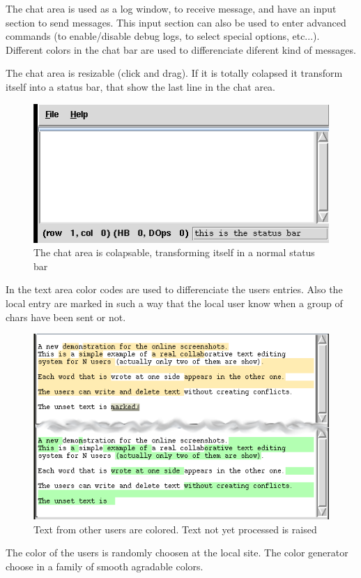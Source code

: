 \documentclass{report}
\begin{document}
  
The chat area is used as a log window, to receive message, and have an input section to send messages. This input section can also be used to enter advanced commands (to enable/disable debug logs, to select special options, etc...). Different colors in the chat bar are used to differenciate diferent kind of messages.

The chat area is resizable (click and drag). If  it is totally colapsed it transform itself into a status bar, that show the last line in the chat area.

\begin{figure}[htbp]
 \begin{center}
    \includegraphics[angle=0,width=0.5\linewidth]{schemas/colapsable_chat_area.png}
 \end{center}
 \label{fig:colapsablechatarea}
 \caption{The chat area is colapsable, transforming itself in a normal status bar}
\end{figure}


In the text area color codes are used to differenciate the users entries. Also the local entry are marked in such a way that the local user know when a group of chars have been sent or not.


\begin{figure}[htbp]
 \begin{center}
    \includegraphics[angle=0,width=0.5\linewidth]{schemas/collaborating_small_shot.png}
 \end{center}
 \caption{Text from other users are colored. Text not yet processed is raised}
 \label{fig:collaboratingsmallshot}
\end{figure}


The color of the users is randomly choosen at the local site. The color generator choose in a family of smooth agradable colors. 
\end{document}
